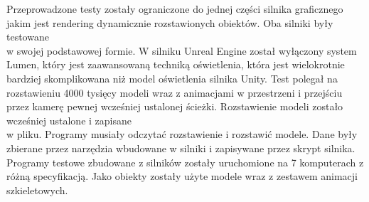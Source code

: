 \documentclass[12pt,twoside]{article}
\begin{document}
Przeprowadzone testy zostały ograniczone do jednej części silnika graficznego
jakim jest rendering dynamicznie rozstawionych obiektów. Oba silniki były
testowane\\w swojej podstawowej formie. W silniku Unreal Engine został wyłączony
system Lumen, który jest zaawansowaną techniką oświetlenia, która jest
wielokrotnie bardziej skomplikowana niż model oświetlenia silnika Unity. Test
polegał na rozstawieniu 4000 tysięcy modeli wraz z animacjami w przestrzeni i
przejściu przez kamerę pewnej wcześniej ustalonej ścieżki. Rozstawienie modeli
zostało wcześniej ustalone i zapisane\\w pliku. Programy musiały odczytać
rozstawienie i rozstawić modele. Dane były zbierane przez narzędzia wbudowane w
silniki i zapisywane przez skrypt silnika. Programy testowe zbudowane z silników
zostały uruchomione na 7 komputerach z różną specyfikacją. Jako obiekty zostały
użyte modele wraz z zestawem animacji szkieletowych. 
\end{document}
